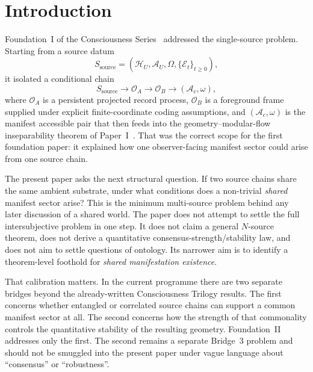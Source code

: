\documentclass[12pt]{article}
\theoremstyle{definition}
\theoremstyle{remark}
\begin{document}
\begin{abstract}
This paper treats only the mathematical bridge from multi-source data to
shared accessible sectors. It does not claim a general \(N\)-source
theorem, does not provide a quantitative consensus--stability bound, and
does not derive the candidate shared sector from bare multi-source
dynamics alone. It also does not attempt to settle questions of
intersubjective ontology.
 \end{abstract}

\clearpage
\tableofcontents
\clearpage

\section{Introduction}\label{sec:intro}

Foundation~I of the Consciousness Series~\cite{FoundationI} addressed
the single-source problem. Starting from a source datum
\[
S_{\mathrm{source}}
=
(\mathcal H_U,\mathcal A_U,\Omega,\{\mathcal E_t\}_{t\ge 0}),
\]
it isolated a conditional chain
\[
S_{\mathrm{source}}
\to
\mathcal O_A
\to
\mathcal O_B
\to
(\mathcal A_c,\omega),
\]
where \(\mathcal O_A\) is a persistent projected record process,
\(\mathcal O_B\) is a foreground frame supplied under explicit
finite-coordinate coding assumptions, and
\((\mathcal A_c,\omega)\) is the manifest accessible pair that then
feeds into the geometry--modular-flow inseparability theorem of
Paper~I~\cite{PaperI}. That was the correct scope for the first
foundation paper: it explained how one observer-facing manifest sector
could arise from one source chain.

The present paper asks the next structural question. If two source
chains share the same ambient substrate, under what conditions does a
non-trivial \emph{shared} manifest sector arise? This is the minimum
multi-source problem behind any later discussion of a shared world. The
paper does not attempt to settle the full intersubjective problem in one
step. It does not claim a general \(N\)-source theorem, does not derive
a quantitative consensus-strength/stability law, and does not aim to
settle questions of ontology. Its narrower aim is to identify a
theorem-level foothold for \emph{shared manifestation existence}.

That calibration matters. In the current programme there are two
separate bridges beyond the already-written Consciousness Trilogy
results. The first concerns whether entangled or correlated source
chains can support a common manifest sector at all. The second concerns
how the strength of that commonality controls the quantitative stability
of the resulting geometry. Foundation~II addresses only the first. The
second remains a separate Bridge~3 problem and should not be smuggled
into the present paper under vague language about ``consensus'' or
``robustness''.
\end{document}
